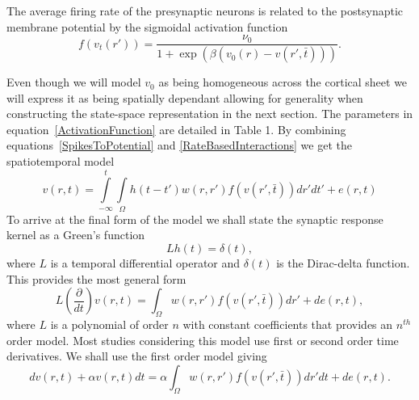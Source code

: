 \documentclass[onecolumn,draftcls]{IEEEtran}
\begin{document}
The average firing rate of the presynaptic neurons is related to the postsynaptic membrane potential by the sigmoidal activation function
\begin{equation}\label{ActivationFunction}
f\left( {{v_t}\left( {r'} \right)} \right) = \frac{{{\nu _0}}}{{1 + \exp \left( {\beta \left( {{v_0}\left( r \right) - {v}\left(r',\bar{t} \right)} \right)} \right)}}.
\end{equation}

Even though we will model  $v_0$ as being homogeneous across the cortical sheet we will express it as being spatially dependant allowing for generality when constructing the state-space representation in the next section. The parameters in equation~\ref{ActivationFunction} are detailed in Table 1. By combining equations~\ref{SpikesToPotential} and \ref{RateBasedInteractions} we get the spatiotemporal model
\begin{equation}\label{FullDoubleIntModel}
v\left(r,t\right) = \int\limits_{-\infty}^t\int\limits_\Omega  h\left(t - t'\right)w\left(r,r'\right)f\left( v\left( r',\bar t \right)\right)dr' dt'+e\left(r,t\right)
\end{equation}
To arrive at the final form of the model we shall state the synaptic response kernel as a Green's function
\begin{equation}\label{GreensFuncDef}
Lh\left( t \right) = \delta \left( t \right),
\end{equation}
where $L$ is a temporal differential operator and $\delta(t)$ is the Dirac-delta function. This provides the most general form
\begin{equation}\label{GenForm}
L\left( \frac{\partial }{dt} \right)v\left( {r,t} \right) = \int_\Omega  {w\left( {r,r'} \right)f\left( {v\left( {r',\bar t} \right)} \right)dr'}  + de\left( r,t \right),
\end{equation}
where $L$ is a polynomial of order $n$ with constant coefficients that provides an $n^{th}$ order model. Most studies considering this model use first or second order time derivatives. We shall use the first order model giving
\begin{equation}\label{FinalForm1}
dv\left( {r,t} \right) + \alpha v\left( r,t \right)dt = \alpha\int_\Omega  {w\left( r,r' \right)f\left( {v\left( r',\bar t \right)} \right)dr'dt}  +de\left( r,t \right).
\end{equation}
\end{document}

